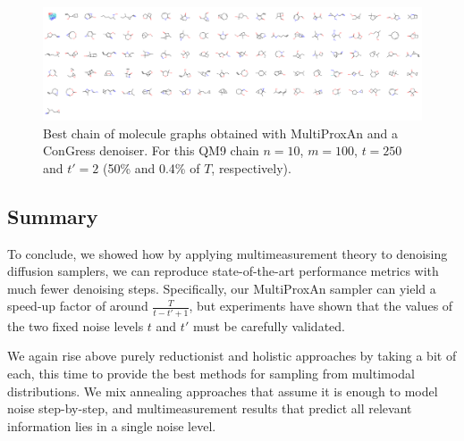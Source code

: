 \begin{figure}[H]
    \centering
    \includegraphics[width=\linewidth]{figures/multiprox/qm9_grid_image.png}
    \caption[Best chain of molecule graphs obtained with MultiProxAn.]{Best chain of molecule graphs obtained with MultiProxAn and a ConGress denoiser. For this QM9 chain $n=10$, $m=100$, $t=250$ and $t'=2$ (50\% and 0.4\% of $T$, respectively).
    }
    \label{fig:qm9_better}
\end{figure}

\subsection{Summary}

To conclude, we showed how by applying multimeasurement theory to denoising diffusion samplers, we can reproduce state-of-the-art performance metrics with much fewer denoising steps. Specifically, our MultiProxAn sampler can yield a speed-up factor of around $\frac{T}{t-t'+1}$, but experiments have shown that the values of the two fixed noise levels $t$ and $t'$ must be carefully validated. 

We again rise above purely reductionist and holistic approaches by taking a bit of each, this time to provide the best methods for sampling from multimodal distributions. We mix annealing approaches that assume it is enough to model noise step-by-step, and multimeasurement results that predict all relevant information lies in a single noise level. 